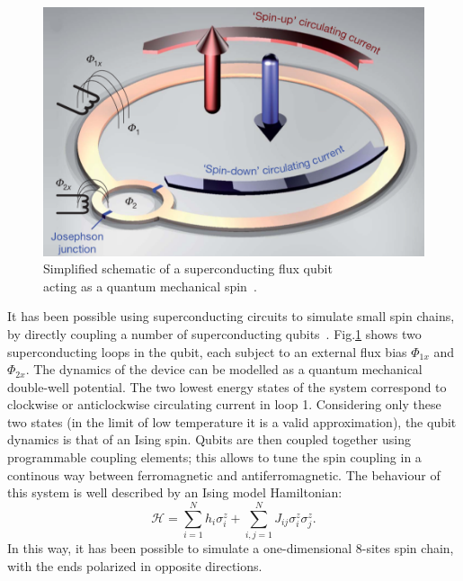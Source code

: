 \begin{figure}[H]
    \centering
    \includegraphics[scale=0.5]{Figures/superconductinCircuit_SpinSystem.png}
    \captionsetup{width=1.\linewidth}
    \caption{Simplified schematic of a superconducting flux qubit \\acting as a quantum mechanical spin~\cite{8spinChain_simulatedByQubits}.}
    \label{fig:superconductinCircuit_SpinSystem}
\end{figure}

It has been possible using superconducting circuits to simulate small spin chains, by directly coupling a number of superconducting qubits~\cite{8spinChain_simulatedByQubits}. Fig.\ref{fig:superconductinCircuit_SpinSystem} shows two superconducting loops in the qubit, each subject to an external flux bias $\Phi_{1x}$ and $\Phi_{2x}$. The dynamics of the device can be modelled as a quantum mechanical double-well potential. The two lowest energy states of the system correspond to clockwise or anticlockwise circulating current in loop 1. Considering only these two states (in the limit of low temperature it is a valid approximation), the qubit dynamics is that of an Ising spin. Qubits are then coupled together using programmable coupling elements; this allows to tune the spin coupling in a continous way between ferromagnetic and antiferromagnetic. The behaviour of this system is well described by an Ising model Hamiltonian:
\begin{equation*}
    \mathcal{H} = \sum_{i=1}^{N} h_i\sigma_i^z + \sum_{i,j=1}^{N} J_{ij}\sigma_i^z\sigma_j^z.
\end{equation*}
In this way, it has been possible to simulate a one-dimensional 8-sites spin chain, with the ends polarized in opposite directions.